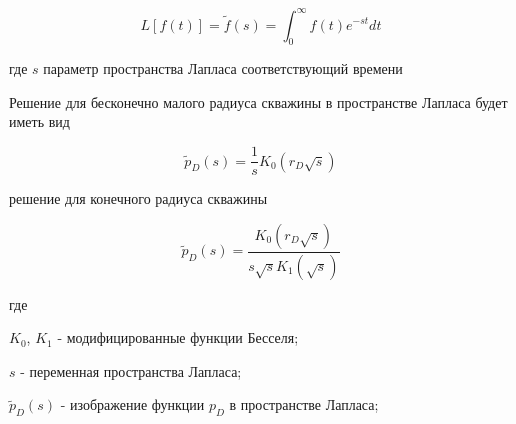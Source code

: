 $$ L \left [ f(t) \right] = \tilde{f}(s) = \int_{0}^{\infty}f(t)e^{-st}dt $$

где $s$ параметр пространства Лапласа соответствующий времени

Решение для бесконечно малого радиуса скважины в пространстве Лапласа будет иметь вид

\begin{equation}  \label{eq:laplace_solution_1}
\tilde{p}_D(s) = \frac{1}{s} K_0 \left( r_D \sqrt s  \right) 
\end{equation}

решение для конечного радиуса скважины \cite{Everdingen_1949}

\begin{equation} \label{eq:laplace_solution_2}
	\tilde{p}_D(s) = \frac{K_0 \left( r_D \sqrt{s}  \right) }{ s \sqrt{s} K_1 \left( \sqrt s  \right)  }
\end{equation}

где 

$K_0$, $K_1$ - модифицированные функции Бесселя;


$s$ - переменная пространства Лапласа;

$\tilde{p}_D(s)$ - изображение функции ${p}_D$ в пространстве Лапласа;

